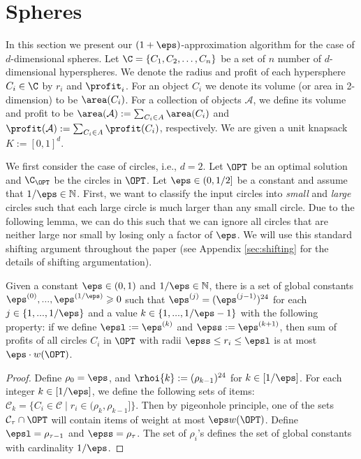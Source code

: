 \section{Spheres}
\label{sec:spheres}
In this section we present our $(1+\eps)$-approximation algorithm
for the case of $d$-dimensional spheres.
Let $\C = \{ C_1, C_2, \dots , C_n \}$ be a set of  $n$ number of $d$-dimensional hyperspheres. We denote the radius and profit of each hypersphere \(C_i \in \C\) by \(r_i\) and \(\profit_i\). 
For an object $C_i$ we denote its volume (or area in 2-dimension) to be $\area(C_i)$. 
For a collection of objects $\mathcal{A}$, we define its volume and profit to be $\area(\mathcal{A}):=\sum_{C_i \in A} \area(C_i)$ and $\profit(\mathcal{A}):=\sum_{C_i \in A} \profit(C_i)$, respectively.
We are given a unit knapsack $K := [0,1]^d$. 




We first consider the case of circles, i.e., $d=2$.
Let $\OPT$ be an optimal solution and $\C_{\OPT}$ be the circles in $\OPT$.
Let $\eps \in (0,1/2]$ be a constant and assume that $1/\eps\in\mathbb{N}$. First,
we want to classify the input circles into \emph{small} and \emph{large
}circles such that each large circle is much larger than any small circle.
Due to the following lemma, we can do this such that we can ignore
all circles that are neither large nor small by losing only a factor
of $\eps$. 
We will use this standard shifting argument throughout the paper (see Appendix \ref{sec:shifting} for the details of shifting argumentation). 

\begin{lem}
\label{lem:create-gap} Given a constant $\eps\in (0,1)$ and $1/\eps \in \mathbb{N}$, there is a
	set of global constants $\eps^{(0)},...,\eps^{(1/\eps)}\geqslant 0$ such that
	$\eps^{(j)}=(\eps^{(j-1)})^{24}$ for each $j\in\{1,...,{1/\eps}\}$
	and a value $k\in\{1,...,{1/\eps}-1\}$ with the following property: if we define
	$\epsl:=\eps^{(k)}$ and $\epss:=\eps^{(k+1)}$, 
	then sum of profits of all circles $C_i$ in $\OPT$ with radii $\epss \leq r_i \leq \epsl$ is at most $\eps \cdot w(\OPT)$.
\end{lem}

\begin{proof}
Define $\rho_0=\eps$, and $\rhoi{k} := (\rho_{k-1})^{24}$ for $k \in [1/\eps]$. For each integer $k \in [1/\eps]$,  we define the following sets of items:
$\mathcal{C}_k = \{C_i \in \mathcal{C} \mid r_{i} \in (\rho_{k},\rho_{k-1}]\}$.
Then by pigeonhole principle, one of the sets $\mathcal{C}_{\tau} \cap \OPT$ will contain items of weight at most $\eps w(\OPT)$.
Define $\epsl=\rho_{\tau-1}$ and $\epss=\rho_{\tau}$. The set of $\rho_i$'s defines the set of global constants with cardinality $1/\eps$. 
\end{proof}




